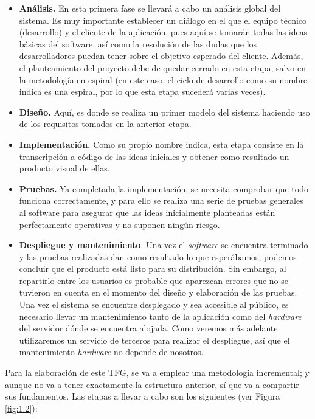\documentclass[../main.tex]{subfiles}
\begin{document}
\begin{itemize}
    \item \textbf{Análisis.} En esta primera fase se llevará a cabo un análisis global del sistema. Es muy importante establecer un diálogo en el que el equipo técnico (desarrollo) y el cliente de la aplicación, pues aquí se tomarán todas las ideas básicas del software, así como la resolución de las dudas que los desarrolladores puedan tener sobre el objetivo esperado del cliente. Además, el planteamiento del proyecto debe de quedar cerrado en esta etapa, salvo en la metodología en espiral (en este caso, el ciclo de desarrollo como su nombre indica es una espiral, por lo que esta etapa sucederá varias veces).
    \item \textbf{Diseño.} \label{software_diseño_etapa} Aquí, es donde se realiza un primer modelo del sistema haciendo uso de los requisitos tomados en la anterior etapa.
    \item \textbf{Implementación.} Como su propio nombre indica, esta etapa consiste en la transcripción a código de las ideas iniciales y obtener como resultado un producto visual de ellas.
    \item \textbf{Pruebas.} Ya completada la implementación, se necesita comprobar que todo funciona correctamente, y para ello se realiza una serie de pruebas generales al software para asegurar que las ideas inicialmente planteadas están perfectamente operativas y no suponen ningún riesgo.
    \item \textbf{Despliegue y mantenimiento}. Una vez el \textit{software} se encuentra terminado y las pruebas realizadas dan como resultado lo que esperábamos, podemos concluir que el producto está listo para su distribución. Sin embargo, al repartirlo entre los usuarios es probable que aparezcan errores que no se tuvieron en cuenta en el momento del diseño y elaboración de las pruebas. Una vez el sistema se encuentre desplegado y sea accesible al público, es necesario llevar un mantenimiento tanto de la aplicación como del \textit{hardware} del servidor dónde se encuentra alojada. Como veremos más adelante utilizaremos un servicio de terceros para realizar el despliegue, así que el mantenimiento \textit{hardware} no depende de nosotros.
\end{itemize}


Para la elaboración de este TFG, se va a emplear una metodología incremental; y aunque no va a tener exactamente la estructura anterior, sí que va a compartir sus fundamentos. Las etapas a llevar a cabo son los siguientes (ver Figura \ref{fig:1.2}):
\end{document}
